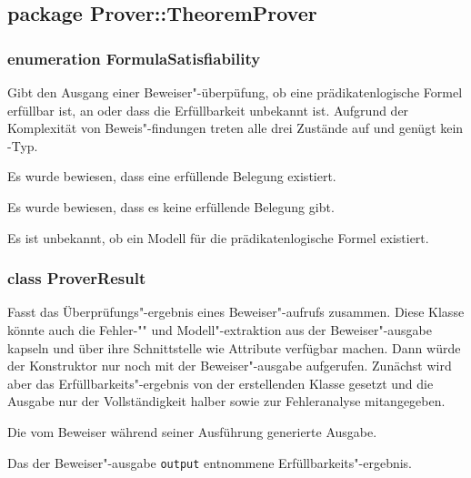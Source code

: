 \subsection{package Prover::TheoremProver}%

\subsubsection{enumeration FormulaSatisfiability}%

Gibt den Ausgang einer Beweiser"-überpüfung, ob eine
prädikatenlogische Formel erfüllbar ist, an oder dass die
Erfüllbarkeit unbekannt ist. Aufgrund der Komplexität von
Beweis"-findungen treten alle drei Zustände auf und genügt kein
\bool-Typ.%

\begin{description}%

    Es wurde bewiesen, dass eine erfüllende Belegung existiert.%


    Es wurde bewiesen, dass es keine erfüllende Belegung gibt.%


    Es ist unbekannt, ob ein Modell für die prädikatenlogische Formel
    existiert.%

\end{description}%

\subsubsection{class ProverResult}%

Fasst das Überprüfungs"-ergebnis eines Beweiser"-aufrufs zusammen.
Diese Klasse könnte auch die Fehler-"" und Modell"-extraktion aus der
Beweiser"-ausgabe kapseln und über ihre Schnittstelle wie Attribute
verfügbar machen. Dann würde der Konstruktor nur noch mit der
Beweiser"-ausgabe aufgerufen. Zunächst wird aber das
Erfüllbarkeits"-ergebnis von der erstellenden Klasse gesetzt und die
Ausgabe nur der Vollständigkeit halber sowie zur Fehleranalyse
mitangegeben.%

\begin{description}%

    Die vom Beweiser während seiner Ausführung generierte Ausgabe.%


    Das der Beweiser"-ausgabe \texttt{output} entnommene
    Erfüllbarkeits"-ergebnis.%

\end{description}%

